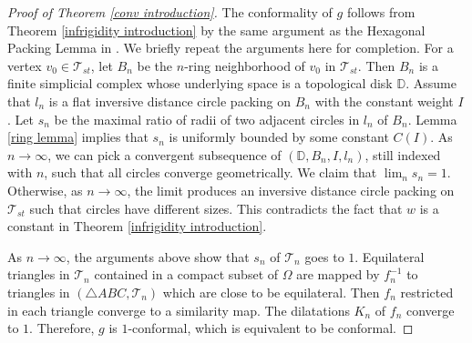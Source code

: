 \documentclass[12pt]{amsart}
\def\T{\mathcal{T}}
\begin{document}
\begin{proof}[Proof of Theorem \ref{conv introduction}]
The conformality of $g$ follows from Theorem \ref{infrigidity introduction} by the same argument as the Hexagonal Packing Lemma in \cite{RS}. We briefly repeat the arguments here for completion.
For a vertex $v_0\in \mathcal{T}_{st}$, let $B_n$ be the $n$-ring neighborhood of $v_0$ in $\mathcal{T}_{st}$. Then $B_n$ is a finite simplicial complex whose underlying space is a topological disk $\mathbb{D}$. Assume that $l_n$ is a flat inversive distance circle packing on $B_n$ with the constant weight $I$. Let $s_n$ be the maximal ratio of radii of two adjacent circles in $l_n$ of $B_n$. Lemma \ref{ring lemma} implies that $s_n$ is uniformly bounded by some constant $C(I)$. As $n\to \infty$, we can pick a convergent subsequence of $(\mathbb{D}, B_n, I, l_n)$, still indexed with $n$, such that all circles converge geometrically. We claim that $\lim_n{s_n} = 1$. Otherwise, as $n\to \infty$, the limit produces an inversive distance circle packing on $\mathcal{T}_{st}$ such that circles have different sizes. This contradicts  the fact that $w$ is a constant in Theorem \ref{infrigidity introduction}.


As $n\to \infty$, the arguments above show that $s_n$ of $\mathcal{T}_n$ goes to $1$. Equilateral triangles in $\T_n$ contained in a compact subset of $\Omega$ are mapped by $f_n^{-1}$ to triangles in $(\triangle ABC, \T_n)$ which are close to be equilateral. Then $f_n$ restricted in each triangle converge to a similarity map. The dilatations $K_n$ of $f_n$ converge to $1$. Therefore, $g$ is $1$-conformal, which is equivalent to be conformal.
\end{proof}











\end{document}
